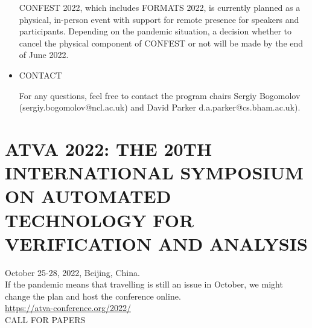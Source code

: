 \documentclass[prodmode,acmtecs]{acmsmall} %
\begin{document}
\begin{itemize}
  CONFEST 2022, which includes FORMATS 2022, is currently planned as a physical, in-person event with support for remote presence for speakers and participants. Depending on the pandemic situation, a decision whether to cancel the physical component of CONFEST or not will be made by the end of June 2022. 
 
\item  CONTACT 
 
  For any questions, feel free to contact the program chairs Sergiy Bogomolov (sergiy.bogomolov@ncl.ac.uk) and David Parker d.a.parker@cs.bham.ac.uk). 
 
\end{itemize}\section{ATVA 2022: THE 20TH INTERNATIONAL SYMPOSIUM ON AUTOMATED TECHNOLOGY FOR VERIFICATION AND ANALYSIS }\label{ATVA2022}  October 25-28, 2022, Beijing, China. \\ 
  If the pandemic means that travelling is still an issue in October, we might change the plan and host the conference online.\\ 
  \href{https://atva-conference.org/2022/}{https://atva-conference.org/2022/}\\ 
CALL FOR PAPERS 
\end{document}
